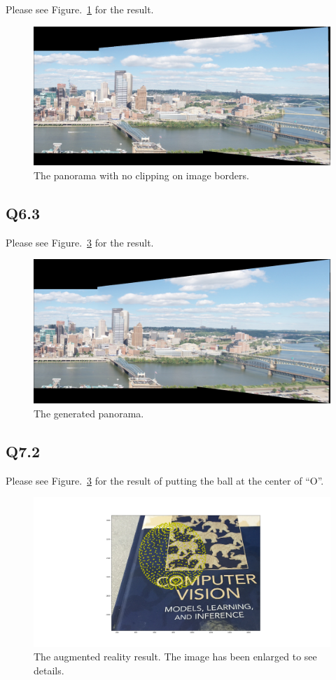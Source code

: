 \documentclass[11pt]{article}
\begin{document}
Please see Figure.~\ref{fig:q6.2} for the result.

\begin{figure}[h!]
    \centering
    \includegraphics[width=.8\linewidth]{../results/q6_2_pan.jpg}
    \caption{The panorama with no clipping on image borders. }
    \label{fig:q6.2}
\end{figure}

\newpage

\subsection*{Q6.3}

Please see Figure.~\ref{fig:q6.3} for the result.

\begin{figure}[h!]
    \centering
    \includegraphics[width=.8\linewidth]{../results/q6_3.jpg}
    \caption{The generated panorama. }
    \label{fig:q6.3}
\end{figure}

\newpage

\subsection*{Q7.2}

Please see Figure.~\ref{fig:q6.3} for the result of putting the ball at the center of ``O''.

\begin{figure}[h!]
    \centering
    \includegraphics[width=\linewidth]{../results/q7_2.png}
    \caption{The augmented reality result. The image has been enlarged to see details.  }
    \label{fig:q6.3}
\end{figure}
\end{document}
